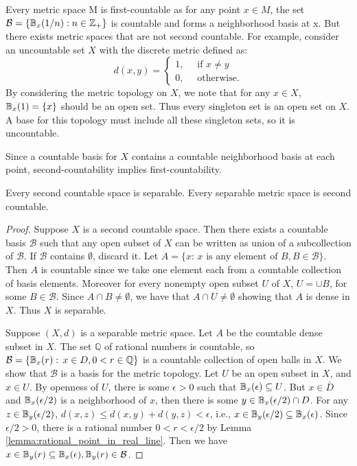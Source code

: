 \documentclass[11pt,a4paper]{article}
\begin{document}
\begin{example}
Every metric space M is first-countable as for any point $x\in M$, the set $\mathcal{B}=\{\mathbb{B}_x(1/n):n\in\mathbb{Z}_+\}$ is countable and forms a neighborhood basis at x. But there exists metric spaces that are not second countable. For example, consider an uncountable set $X$ with the discrete metric defined as:
\[
d(x,y) = 
\begin{cases}
    1, \quad{\text{ if } x \neq y}\\
    0, \quad{\text{ otherwise.}}
\end{cases}
\]
By considering the metric topology on $X$, we note that for any $x\in X$, $\mathbb{B}_x(1) = \{x\}$ should be an open set. Thus every singleton set is an open set on $X$. A base for this topology must include all these singleton sets, so it is uncountable.
\end{example}

\begin{remark}
Since a countable basis for $X$ contains a countable neighborhood basis at each point, second-countability implies first-countability.
\end{remark}

\begin{prop}\label{prop:metric_space_separable_second_countable}
Every second countable space is separable. Every separable metric space is second countable.
\end{prop}

\begin{proof}
Suppose $X$ is a second countable space. Then there exists a countable basis $\mathcal{B}$ such that any open subset of $X$ can be written as union of a subcollection of $\mathcal{B}$. If $\mathcal{B}$ contains $\emptyset$, discard it. Let $A = \{x:\,x\text{ is any element of } B,B\in \mathcal{B}\}$. Then $A$ is countable since we take one element each from a countable collection of basis elements. Moreover for every nonempty open subset $U$ of $X$, $U = \cup B$, for some $B\in \mathcal{B}$. Since $A\cap B\neq \emptyset$, we have that $A\cap U\neq \emptyset$ showing that $A$ is dense in $X$. Thus $X$ is separable. 

Suppose $(X,d)$ is a separable metric space. Let $A$ be the countable dense subset in $X$. The set $\mathbb{Q}$ of rational numbers is countable, so $\mathcal{B} = \{\mathbb{B}_{x}(r):\,x\in D, 0<r\in \mathbb{Q}\}$ is a countable collection of open balls in $X$. We show that $\mathcal{B}$ is a basis for the metric topology. Let $U$ be an open subset in $X$, and $x\in U$. By openness of $U$, there is some $\epsilon>0$ such that $\mathbb{B}_x(\epsilon)\subseteq U$. But $x\in \bar{D}$ and $\mathbb{B}_x(\epsilon/2)$ is a neighborhood of $x$, then there is some $y\in \mathbb{B}_x(\epsilon/2)\cap D$. For any $z\in \mathbb{B}_y(\epsilon/2)$, $d(x,z)\le d(x,y)+d(y,z)<\epsilon$, i.e., $x\in \mathbb{B}_y(\epsilon/2)\subseteq \mathbb{B}_x(\epsilon)$. Since $\epsilon/2>0$, there is a rational number $0<r<\epsilon/2$ by Lemma \ref{lemma:rational_point_in_real_line}. Then we have $x\in \mathbb{B}_y(r)\subseteq \mathbb{B}_x(\epsilon),\mathbb{B}_y(r)\in \mathcal{B}$. 
\end{proof}
\end{document}
